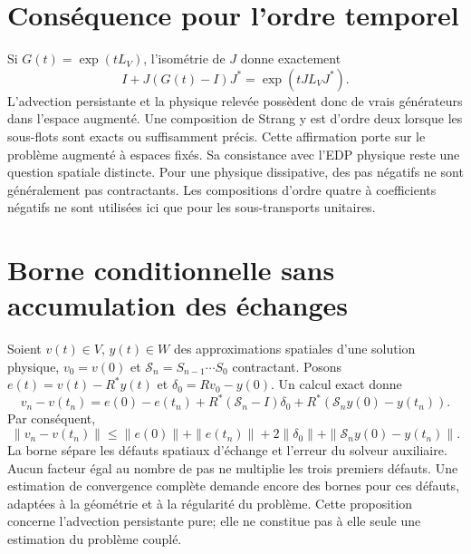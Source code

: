 \documentclass[11pt,a4paper]{article}
\newcommand{\id}{I}
\begin{document}
\section{Conséquence pour l'ordre temporel}
Si $G(t)=\exp(tL_V)$, l'isométrie de $J$ donne exactement
\[
 \id+J(G(t)-\id)J^*=\exp(tJL_VJ^*).
\]
L'advection persistante et la physique relevée possèdent donc de vrais
générateurs dans l'espace augmenté. Une composition de Strang y est
d'ordre deux lorsque les sous-flots sont exacts ou suffisamment précis.
Cette affirmation porte sur le problème augmenté à espaces fixés.
Sa consistance avec l'EDP physique reste une question spatiale distincte.
Pour une physique dissipative, des pas négatifs ne sont généralement pas
contractants. Les compositions d'ordre quatre à coefficients négatifs ne
sont utilisées ici que pour les sous-transports unitaires.

\section{Borne conditionnelle sans accumulation des échanges}
Soient $v(t)\in V$, $y(t)\in W$ des approximations spatiales d'une solution
physique, $v_0=v(0)$ et $\mathcal S_n=S_{n-1}\cdots S_0$ contractant.
Posons $e(t)=v(t)-R^*y(t)$ et $\delta_0=Rv_0-y(0)$.
Un calcul exact donne
\[
 v_n-v(t_n)=e(0)-e(t_n)
 +R^*(\mathcal S_n-\id)\delta_0
 +R^*(\mathcal S_n y(0)-y(t_n)).
\]
Par conséquent,
\[
 \|v_n-v(t_n)\|
 \leq\|e(0)\|+\|e(t_n)\|+2\|\delta_0\|
       +\|\mathcal S_n y(0)-y(t_n)\| .
\]
La borne sépare les défauts spatiaux d'échange et l'erreur du solveur
auxiliaire. Aucun facteur égal au nombre de pas ne multiplie les trois
premiers défauts. Une estimation de convergence complète demande encore
des bornes pour ces défauts, adaptées à la géométrie et à la régularité
du problème. Cette proposition concerne l'advection persistante pure;
elle ne constitue pas à elle seule une estimation du problème couplé.
\end{document}
